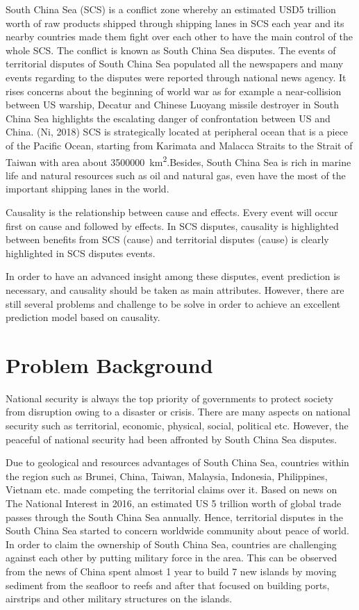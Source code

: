 \documentclass[twosides]{utmthesis}
\begin{document}
South China Sea (SCS) is a conflict zone whereby an estimated USD5 trillion worth of raw products shipped through shipping lanes in SCS each year and its nearby countries made them fight over each other to have the main control of the whole SCS.\citep{the national interest} The conflict is known as South China Sea disputes. The events of territorial disputes of South China Sea populated all the newspapers and many events regarding to the disputes were reported through national news agency. It rises concerns about the beginning of world war as for example a near-collision between US warship, Decatur and Chinese Luoyang missile destroyer in South China Sea highlights the escalating danger of confrontation between US and China. (Ni, 2018) SCS is strategically located at peripheral ocean that is a piece of the Pacific Ocean, starting from Karimata and Malacca Straits to the Strait of Taiwan with area about \SI{3500000}{\km\squared}.Besides, South China Sea is rich in marine life and natural resources such as oil and natural gas, even have the most of the important shipping lanes in the world. \citep{dennise.hayes1980}

Causality is the relationship between cause and effects. Every event will occur first on cause and followed by effects. In SCS disputes, causality is highlighted between benefits from SCS (cause) and territorial disputes (cause) is clearly highlighted in SCS disputes events.
	
In order to have an advanced insight among these disputes, event prediction is necessary, and causality should be taken as main attributes. However, there are still several problems and challenge to be solve in order to achieve an excellent prediction model based on causality.  


\section{Problem Background}
National security is always the top priority of governments to protect society from disruption owing to a disaster or crisis. There are many aspects on national security such as territorial, economic, physical, social, political etc. However, the peaceful of national security had been affronted by South China Sea disputes. 

Due to geological and resources advantages of South China Sea, countries within the region such as Brunei, China, Taiwan, Malaysia, Indonesia, Philippines, Vietnam etc. made competing the territorial claims over it. Based on news on The National Interest in 2016, an estimated US 5 trillion worth of global trade passes through the South China Sea annually. Hence, territorial disputes in the South China Sea started to concern worldwide community about peace of world. In order to claim the ownership of South China Sea, countries are challenging against each other by putting military force in the area. This can be observed from the news of China spent almost 1 year to build 7 new islands by moving sediment from the seafloor to reefs and after that focused on building ports, airstrips and other military structures on the islands. 
\end{document}
